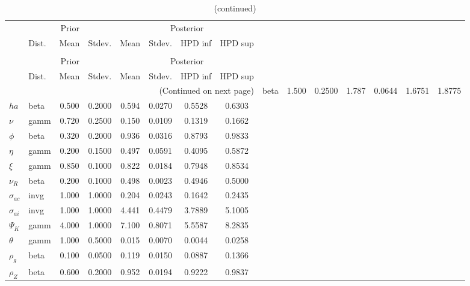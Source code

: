  
\begin{center}
\begin{longtable}{llcccccc} 
\caption{Results from Metropolis-Hastings (parameters)}
 \label{Table:MHPosterior:1}\\
\toprule 
  & \multicolumn{3}{c}{Prior}  &  \multicolumn{4}{c}{Posterior} \\
  \cmidrule(r{.75em}){2-4} \cmidrule(r{.75em}){5-8}
  & Dist. & Mean  & Stdev. & Mean & Stdev. & HPD inf & HPD sup\\
\midrule \endfirsthead 
\caption{(continued)}\\\toprule 
  & \multicolumn{3}{c}{Prior}  &  \multicolumn{4}{c}{Posterior} \\
  \cmidrule(r{.75em}){2-4} \cmidrule(r{.75em}){5-8}
  & Dist. & Mean  & Stdev. & Mean & Stdev. & HPD inf & HPD sup\\
\midrule \endhead 
\bottomrule \multicolumn{8}{r}{(Continued on next page)} \endfoot 
\bottomrule \endlastfoot 
${\sigma}$ & beta &   1.500 & 0.2500 &   1.787& 0.0644 &  1.6751 &  1.8775 \\ 
${ha}$ & beta &   0.500 & 0.2000 &   0.594& 0.0270 &  0.5528 &  0.6303 \\ 
$\nu$ & gamm &   0.720 & 0.2500 &   0.150& 0.0109 &  0.1319 &  0.1662 \\ 
${\phi}$ & beta &   0.320 & 0.2000 &   0.936& 0.0316 &  0.8793 &  0.9833 \\ 
${\eta}$ & gamm &   0.200 & 0.1500 &   0.497& 0.0591 &  0.4095 &  0.5872 \\ 
$\xi$ & gamm &   0.850 & 0.1000 &   0.822& 0.0184 &  0.7948 &  0.8534 \\ 
${\nu_R}$ & beta &   0.200 & 0.1000 &   0.498& 0.0023 &  0.4946 &  0.5000 \\ 
${\sigma_{ac}}$ & invg &   1.000 & 1.0000 &   0.204& 0.0243 &  0.1642 &  0.2435 \\ 
${\sigma_{ai}}$ & invg &   1.000 & 1.0000 &   4.441& 0.4479 &  3.7889 &  5.1005 \\ 
${\Psi_{K}}$ & gamm &   4.000 & 1.0000 &   7.100& 0.8071 &  5.5587 &  8.2835 \\ 
${\theta}$ & gamm &   1.000 & 0.5000 &   0.015& 0.0070 &  0.0044 &  0.0258 \\ 
${\rho_g}$ & beta &   0.100 & 0.0500 &   0.119& 0.0150 &  0.0887 &  0.1366 \\ 
${\rho_Z}$ & beta &   0.600 & 0.2000 &   0.952& 0.0194 &  0.9222 &  0.9837 \\ 

\end{longtable}
\end{center}
